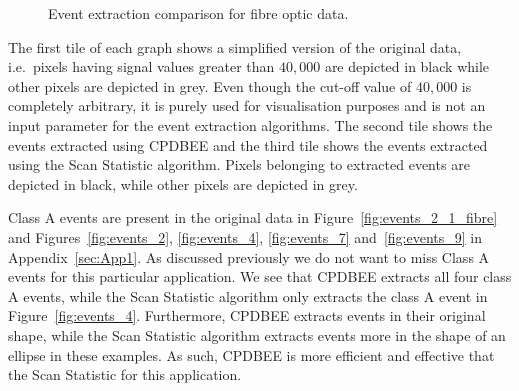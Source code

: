 \documentclass[a4paper,11pt]{article}
\begin{document}
\begin{figure}[!htbp]
	\centering
	\caption{Event extraction comparison for fibre optic data.}
	\label{fig:events_fibre_optic}
\end{figure}


The first tile of each graph shows a simplified version of the  original data, i.e.\ pixels having signal values greater than $40,000$ are depicted in black while other pixels are depicted in grey. Even though the cut-off value of $40,000$ is completely arbitrary, it is purely used for visualisation purposes and is not an input parameter for the event extraction algorithms. The second tile shows the events extracted using CPDBEE and the third tile shows the events extracted using the Scan Statistic algorithm. Pixels belonging to extracted events are depicted in black, while other pixels are depicted in grey.

Class A events are present in the original data in Figure~\ref{fig:events_2_1_fibre} and Figures~\ref{fig:events_2}, \ref{fig:events_4}, \ref{fig:events_7} and~\ref{fig:events_9} in Appendix~\ref{sec:App1}. As discussed previously we do not want to miss Class A events for this particular application. We see that CPDBEE extracts all four class A events, while the Scan Statistic algorithm only extracts the class A event in Figure~\ref{fig:events_4}. Furthermore, CPDBEE extracts events in their original shape, while the Scan Statistic algorithm extracts events more in the shape of an ellipse in these examples. As such, CPDBEE is more efficient and effective that the Scan Statistic for this application.
\end{document}
